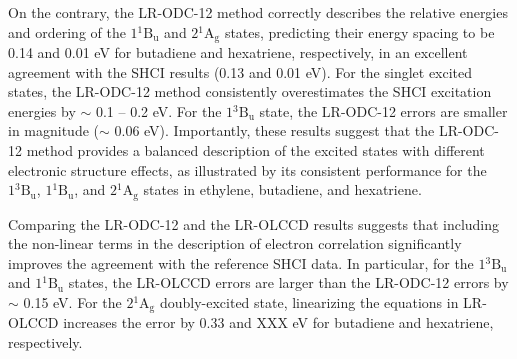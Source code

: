 On the contrary, the LR-ODC-12 method correctly describes the relative energies
and ordering of the $1{}^1\mathrm{B_{u}}$ and $2{}^1\mathrm{A_{g}}$ states,
predicting their energy spacing to be 0.14 and 0.01 eV for butadiene and
hexatriene, respectively, in an excellent agreement with the SHCI results (0.13
and 0.01 eV).
For the singlet excited states, the LR-ODC-12 method consistently overestimates
the SHCI excitation energies by $\sim$ 0.1 -- 0.2 eV.
For the $1{}^3\mathrm{B_{u}}$ state, the LR-ODC-12 errors are smaller in
magnitude ($\sim$ 0.06 eV).
Importantly, these results suggest that the LR-ODC-12 method provides a balanced
description of the excited states with different electronic structure effects,
as illustrated by its consistent performance for the $1{}^3\mathrm{B_{u}}$,
$1{}^1\mathrm{B_{u}}$, and $2{}^1\mathrm{A_{g}}$ states in ethylene, butadiene,
and hexatriene.

Comparing the LR-ODC-12 and the LR-OLCCD results suggests that including the
non-linear terms in the description of electron correlation significantly
improves the agreement with the reference SHCI data.
In particular, for the $1{}^3\mathrm{B_{u}}$ and $1{}^1\mathrm{B_{u}}$ states,
the LR-OLCCD errors are larger than the LR-ODC-12 errors by $\sim$ 0.15 eV.
For the $2{}^1\mathrm{A_{g}}$ doubly-excited state, linearizing the equations in
LR-OLCCD increases the error by 0.33 and {\color{red} XXX} eV for butadiene and
hexatriene, respectively. 
